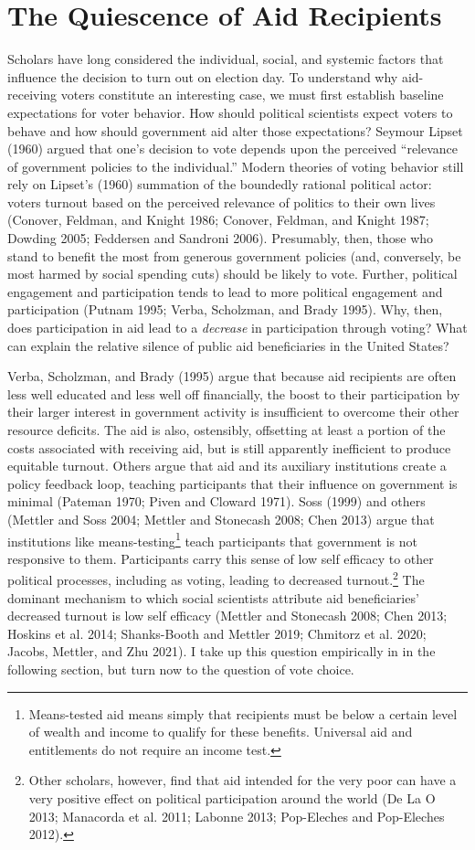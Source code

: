 \documentclass[12pt]{paper}
\begin{document}
\section{The Quiescence of Aid Recipients}
Scholars have long considered the individual, social, and systemic factors that influence the decision to turn out on election day. To understand why aid-receiving voters constitute an interesting case, we must first establish baseline expectations for voter behavior. How should political scientists expect voters to behave and how should government aid alter those expectations?  Seymour Lipset (1960) argued that one's decision to vote depends upon the perceived “relevance of government policies to the individual.” Modern theories of voting behavior still rely on Lipset’s (1960) summation of the boundedly rational political actor: voters turnout based on the perceived relevance of politics to their own lives (Conover, Feldman, and Knight 1986; Conover, Feldman, and Knight 1987; Dowding 2005; Feddersen and Sandroni 2006). Presumably, then, those who stand to benefit the most from generous government policies (and, conversely, be most harmed by social spending cuts) should be likely to vote. Further, political engagement and participation tends to lead to more political engagement and participation (Putnam 1995; Verba, Scholzman, and Brady 1995). Why, then, does participation in aid lead to a \textit{decrease} in participation through voting? What can explain the relative silence of public aid beneficiaries in the United States?

Verba, Scholzman, and Brady (1995) argue that because aid recipients are often less well educated and less well off financially, the boost to their participation by their larger interest in government activity is insufficient to overcome their other resource deficits. The aid is also, ostensibly, offsetting at least a portion of the costs associated with receiving aid, but is still apparently inefficient to produce equitable turnout. Others argue that aid and its auxiliary institutions create a policy feedback loop, teaching participants that their influence on government is minimal (Pateman 1970; Piven and Cloward 1971). Soss (1999) and others (Mettler and Soss 2004; Mettler and Stonecash 2008; Chen 2013) argue that institutions like means-testing\footnote{Means-tested aid means simply that recipients must be below a certain level of wealth and income to qualify for these benefits. Universal aid and entitlements do not require an income test.} teach participants that government is not responsive to them. Participants carry this sense of low self efficacy to other political processes, including as voting, leading to decreased turnout.\footnote{Other scholars, however, find that aid intended for the very poor can have a very positive effect on political participation around the world (De La O 2013; Manacorda et al. 2011; Labonne 2013; Pop-Eleches and Pop-Eleches 2012).} The dominant mechanism to which social scientists attribute aid beneficiaries' decreased turnout is low self efficacy (Mettler and Stonecash 2008; Chen 2013; Hoskins et al. 2014; Shanks-Booth and Mettler 2019; Chmitorz et al. 2020; Jacobs, Mettler, and Zhu 2021). I take up this question empirically in in the following section, but turn now to the question of vote choice.
\end{document}

